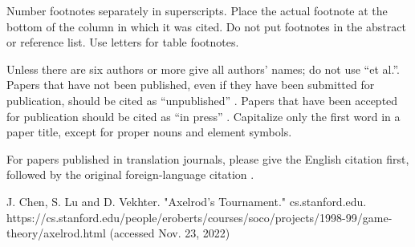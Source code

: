 \documentclass[conference]{IEEEtran}
\begin{document}
Number footnotes separately in superscripts. Place the actual footnote at 
the bottom of the column in which it was cited. Do not put footnotes in the 
abstract or reference list. Use letters for table footnotes.

Unless there are six authors or more give all authors' names; do not use 
``et al.''. Papers that have not been published, even if they have been 
submitted for publication, should be cited as ``unpublished'' \cite{b4}. Papers 
that have been accepted for publication should be cited as ``in press'' \cite{b5}. 
Capitalize only the first word in a paper title, except for proper nouns and 
element symbols.

For papers published in translation journals, please give the English 
citation first, followed by the original foreign-language citation \cite{b6}.

\begin{thebibliography}{00}
 J. Chen, S. Lu and D. Vekhter. "Axelrod's Tournament." cs.stanford.edu. https://cs.stanford.edu/people/eroberts/courses/soco/projects/1998-99/game-theory/axelrod.html (accessed Nov. 23, 2022)
\end{thebibliography}
\end{document}

